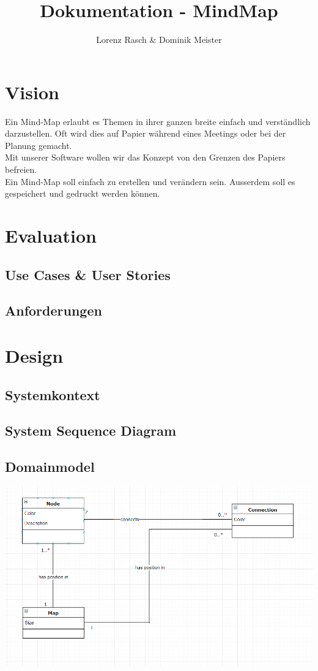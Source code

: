 \documentclass[a4paper,parskip]{scrartcl}
\title{Dokumentation - MindMap}
\author{Lorenz Rasch \& Dominik Meister}
\begin{document}
\maketitle
\tableofcontents
\pagebreak
\section{Vision}
Ein Mind-Map erlaubt es Themen in ihrer ganzen breite einfach und verständlich darzustellen. Oft wird dies auf Papier während eines Meetings oder bei der Planung gemacht.\\
Mit unserer Software wollen wir das Konzept von den Grenzen des Papiers befreien.\\
Ein Mind-Map soll einfach zu erstellen und verändern sein. Ausserdem soll es gespeichert und gedruckt werden können.

\section{Evaluation}
\subsection{Use Cases \& User Stories}
\subsection{Anforderungen}

\section{Design}
\subsection{Systemkontext}
\subsection{System Sequence Diagram}
\subsection{Domainmodel}
\includegraphics[width=\linewidth]{DomainModel.PNG}
\end{document}
